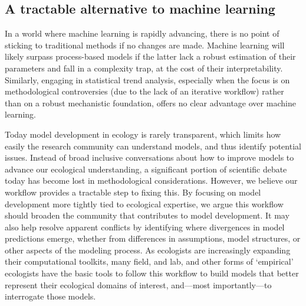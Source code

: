 \documentclass[11pt]{article}
\begin{document}
\subsection{A tractable alternative to machine learning}

In a world where machine learning is rapidly advancing, there is no point of sticking to traditional methods if no changes are made. Machine learning will likely surpass process-based models if the latter lack a robust estimation of their parameters and fall in a complexity trap, at the cost of their interpretability. Similarly, engaging in statistical trend analysis, especially when the focus is on methodological controversies (due to the lack of an iterative workflow) rather than on a robust mechanistic foundation, offers no clear advantage over machine learning. %

Today model development in ecology is rarely transparent, which limits how easily the research community can understand models, and thus identify potential issues. Instead of broad inclusive conversations about how to improve models to advance our ecological understanding, a significant portion of scientific debate today has become lost in methodological considerations. However, we believe our workflow provides a tractable step to fixing this. By focusing on model development more tightly tied to ecological expertise, we argue this workflow should broaden the community that contributes to model development. It may also help resolve apparent conflicts by identifying where divergences in model predictions emerge, whether from differences in assumptions, model structures, or other aspects of the modeling process.
As ecologists are increasingly expanding their computational toolkits, many field, and lab, and other forms of `empirical' ecologists have the basic tools to follow this workflow to build models that better represent their ecological domains of interest, and---most importantly---to interrogate those models.

\clearpage

\end{document}

